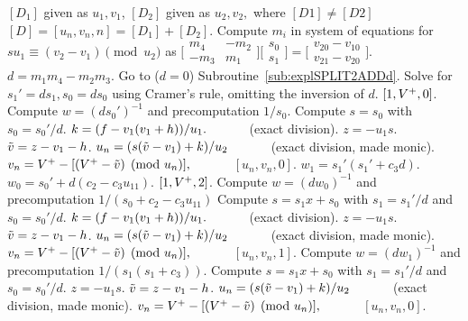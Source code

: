 \begin{algorithm}[htbp]
\caption{Genus 2 Split Model Degree 2 Addition \label{alg:explSPLIT2ADD}}
\begin{algorithmic} [1]
\Require $[D_1]$ given as $u_1,v_1$, $[D_2]$ given as $u_2,v_2,$ where  $[D1] \not = [D2]$ \smallskip
\Ensure $[D] = [u_n,v_n,n] = [D_1] + [D_2] $.
\algrule
\vspace{-2pt}
\State Compute $m_i$ in system of equations for $su_1\equiv (v_2 - v_1) \pmod{u_2}$ as $ \bigl[ \begin{smallmatrix} m_4 & -m_2\\ -m_3 & m_1\end{smallmatrix}\bigr] 
\bigl[ \begin{smallmatrix} s_0\\ s_1 \end{smallmatrix} \bigr ] = \bigl[ \begin{smallmatrix}v_{20} - v_{10} \\  v_{21} - v_{20}\end{smallmatrix} \bigr ]$.
\State $d = m_1m_4 - m_2m_3$.
 \hspace{2pt} Go to ($d = 0$) Subroutine~\ref{sub:explSPLIT2ADDd}.
\EndIf
\State Solve for $s_1' = ds_1, s_0 = ds_0$ using Cramer's rule, omitting the inversion of $d$.
     \Return $[1,V^{+},0]$.
    \Else 
        \State Compute $w = (ds_0')^{-1}$ and precomputation $1/s_0$. 
        \State Compute $s = s_0$ with $s_0 = s_0'/d$.
        \State $k = (f - v_1(v_1 + h))/u_1. \quad\quad\quad$ (exact division).
        \State $z = -u_1s$.
        \State $\tilde{v} = z - v_1 - h$.
        \State $u_n = (s(\tilde{v} - v_1) + k)/u_2 \quad\quad\quad$ (exact division, made monic).
        \State $v_n = V^{+} - [(V^{+} - \tilde{v}) \pmod{u_n}], \quad\quad\quad$ \Return $[u_n,v_n,0]$.
    \EndIf
\EndIf
\State $w_1 = s_1'(s_1' + c_3d)$.
    \State $w_0 = s_0' + d(c_2 - c_3u_{11})$.
     \Return $[1,V^{+},2]$.
    \Else 
        \State Compute $w = (dw_0)^{-1}$ and precomputation $1/(s_0 + c_2 - c_3u_{11})$ 
        \State Compute $s = s_1x + s_0$ with $s_1 = s_1'/d$ and $s_0 = s_0'/d$.
        \State $k = (f - v_1(v_1 + h))/u_1. \quad\quad\quad$ (exact division).   
        \State $z = -u_1s$.
        \State $\tilde{v} = z - v_1 - h$.
        \State $u_n = (s(\tilde{v} - v_1) + k)/u_2 \quad\quad\quad$ (exact division, made monic).
        \State $v_n = V^{+} - [(V^{+} - \tilde{v}) \pmod{u_n}], \quad\quad\quad$ \Return $[u_n,v_n,1]$.
    \EndIf
\EndIf
\State Compute $w = (dw_1)^{-1}$ and precomputation $1/(s_1(s_1 + c_3))$.
\State Compute $s = s_1x + s_0$ with $s_1 = s_1'/d$ and $s_0 = s_0'/d$.
\State $z = -u_1s$.
\State $\tilde{v} = z - v_1 - h$.
\State $u_n = (s(\tilde{v} - v_1) + k)/u_2 \quad\quad\quad$ (exact division, made monic).
\State $v_n = V^{+} - [(V^{+} - \tilde{v}) \pmod{u_n}], \quad\quad\quad$ \Return $[u_n,v_n,0]$.
\vspace{-2pt}
\end{algorithmic}
\end{algorithm}

